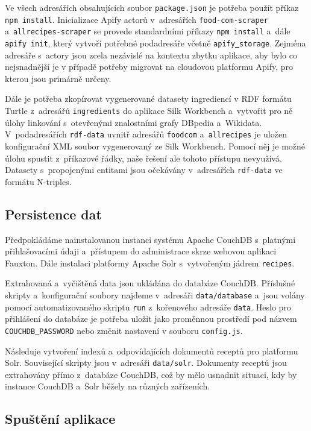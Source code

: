 \documentclass[12pt,a4paper]{report}
\begin{document}
Ve všech adresářích obsahujících soubor \texttt{package.json} je potřeba použít příkaz \texttt{npm\,install}. Inicializace Apify actorů v~adresářích \texttt{food-com-scraper} a~\texttt{allrecipes-scraper} se provede standardními příkazy \texttt{npm\,install} a~dále \texttt{apify\,init}, který vytvoří potřebné podadresáře včetně \texttt{apify\underline{{ }}storage}. Zejména adresáře s~actory jsou zcela nezávislé na kontextu zbytku aplikace, aby bylo co nejsnadnější je v případě potřeby migrovat na cloudovou platformu Apify, pro kterou jsou primárně určeny.

Dále je potřeba zkopírovat vygenerované datasety ingrediencí v RDF formátu Turtle z~adresářů \texttt{ingredients} do aplikace Silk Workbench a~vytvořit pro ně úlohy linkování s~otevřenými znalostními grafy DBpedia a~Wikidata. V~podadresářích \texttt{rdf-data} uvnitř adresářů \texttt{foodcom} a~\texttt{allrecipes} je uložen konfigurační XML soubor vygenerovaný ze Silk Workbench. Pomocí něj je možné úlohu spustit z~příkazové řádky, naše řešení ale tohoto přístupu nevyužívá. Datasety s~propojenými entitami jsou očekávány v~adresářích \texttt{rdf-data} ve formátu N-triples.

\subsection{Persistence dat}

Předpokládáme nainstalovanou instanci systému Apache CouchDB s~platnými přihlašovacími údaji a~přístupem do administrace skrze webovou aplikaci \-Fauxton. Dále instalaci platformy Apache Solr s~vytvořeným jádrem \texttt{recipes}.

Extrahovaná a~vyčištěná data jsou ukládána do databáze CouchDB. Příslušné skripty a~konfigurační soubory najdeme v~adresáři \texttt{data/database} a~jsou volány pomocí automatizovaného skriptu \texttt{run} z~kořenového adresáře \texttt{data}. Heslo pro přihlášení do databáze je potřeba uložit jako proměnnou prostředí pod názvem \texttt{COUCHDB\underline{{ }}PASSWORD} nebo změnit nastavení v souboru \texttt{config.js}.

Následuje vytvoření indexů a~odpovídajících dokumentů receptů pro platformu Solr. Související skripty jsou v~adresáři \texttt{data/solr}. Dokumenty receptů jsou extrahovány přímo z~databáze CouchDB, což by mělo usnadnit situaci, kdy by instance CouchDB a~Solr běžely na různých zařízeních.

\subsection{Spuštění aplikace}
\end{document}
